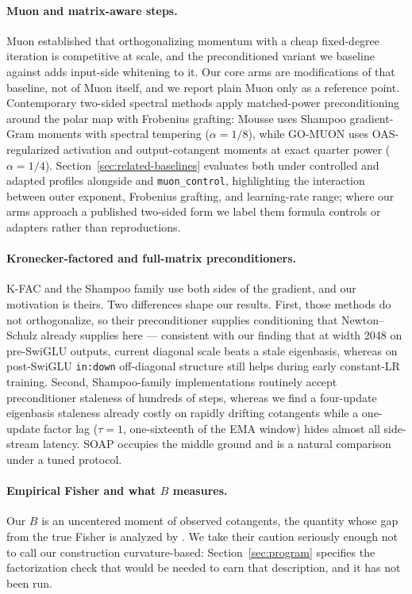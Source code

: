 \paragraph{Muon and matrix-aware steps.}
Muon \citep{jordan2024muon} established that orthogonalizing momentum with a
cheap fixed-degree iteration is competitive at scale, and the preconditioned
variant we baseline against adds input-side whitening to it. Our core arms are
modifications of that baseline, not of Muon itself, and we report plain Muon
only as a reference point. Contemporary two-sided spectral methods apply
matched-power preconditioning around the polar map with Frobenius grafting:
Mousse \citep{zhang2026mousse} uses Shampoo gradient-Gram moments with spectral
tempering ($\alpha = 1/8$), while GO-MUON \citep{che2026gomuon} uses
OAS-regularized activation and output-cotangent moments at exact quarter power
($\alpha = 1/4$). Section~\ref{sec:related-baselines} evaluates both under
controlled and adapted profiles alongside  and \texttt{muon\_control},
highlighting the interaction between outer exponent, Frobenius grafting, and
learning-rate range; where our arms approach a published two-sided form we
label them formula controls or adapters rather than reproductions.

\paragraph{Kronecker-factored and full-matrix preconditioners.}
K-FAC \citep{martens2015kfac} and the Shampoo family
\citep{gupta2018shampoo,anil2020scalable} use both sides of the gradient, and
our motivation is theirs. Two differences shape our results. First, those
methods do not orthogonalize, so their preconditioner supplies conditioning
that Newton--Schulz already supplies here --- consistent with our finding that
at width 2048 on pre-SwiGLU outputs, current diagonal scale beats a stale
eigenbasis, whereas on post-SwiGLU \texttt{in:down} off-diagonal structure still
helps during early constant-LR training. Second, Shampoo-family implementations
routinely accept preconditioner staleness of hundreds of steps, whereas we find
a four-update eigenbasis staleness already costly on rapidly drifting cotangents
while a one-update factor lag ($\tau=1$, one-sixteenth of the EMA window) hides
almost all side-stream latency. SOAP \citep{vyas2024soap} occupies the middle
ground and is a natural comparison under a tuned protocol.

\paragraph{Empirical Fisher and what $B$ measures.}
Our $B$ is an uncentered moment of observed cotangents, the quantity whose gap
from the true Fisher is analyzed by \citet{kunstner2019limitations}. We take
their caution seriously enough not to call our construction curvature-based:
Section~\ref{sec:program} specifies the factorization check that would be
needed to earn that description, and it has not been run.

